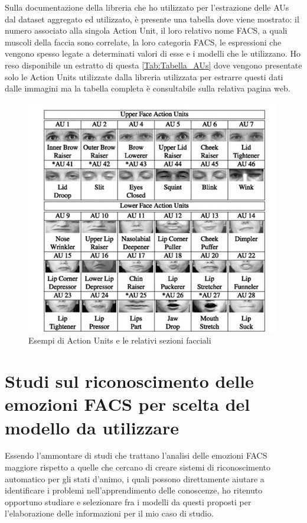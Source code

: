 Sulla documentazione della libreria che ho utilizzato per l’estrazione delle AUs dal dataset aggregato ed utilizzato, è presente una tabella dove viene mostrato: il numero associato alla singola Action Unit, il loro relativo nome FACS, a quali muscoli della faccia sono correlate, la loro categoria FACS, le espressioni che vengono spesso legate a determinati valori di esse e i modelli che le utilizzano. Ho reso disponibile un estratto di questa \ref{Tab:Tabella_AUs} dove vengono presentate solo le Action Units utilizzate dalla libreria \cite{PyFeat} utilizzata per estrarre questi dati dalle immagini ma la tabella completa è consultabile sulla relativa pagina web.
\newpage
\begin{figure}
    \begin{center}    
        \includegraphics[width=1\linewidth]{images/10.jpg}
        \caption{Esempi di Action Units e le relativi sezioni facciali}
    \end{center}
\end{figure}

\section{Studi sul riconoscimento delle emozioni FACS per scelta del modello da utilizzare}
Essendo l’ammontare di studi che trattano l’analisi delle emozioni FACS maggiore rispetto a quelle che cercano di creare sistemi di riconoscimento automatico per gli stati d’animo, i quali possono direttamente aiutare a identificare i problemi nell’apprendimento delle conoscenze, ho ritenuto opportuno studiare e selezionare fra i modelli da questi proposti per l’elaborazione delle informazioni per il mio caso di studio.

